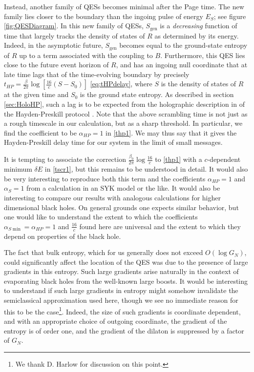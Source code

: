 \documentclass[12pt]{article}
\renewcommand{\ln}{\log}
\begin{document}
Instead, another family of QESs becomes minimal after the Page time.  The new family lies closer to the boundary than the ingoing pulse of energy $E_S$; see figure \ref{fig:QESDiagram}.  In this new family of QESs, $S_{\text{gen}}$ is a {\it decreasing} function of time that largely tracks the density of states of $R$ as determined by its energy.  Indeed, in the asymptotic future, $S_{\text{gen}}$ becomes equal to the ground-state entropy of $R$ up to a term associated with the coupling to $B$.  Furthermore, this QES lies close to the future event horizon of $R$, and has an ingoing null coordinate that at late time lags that of the time-evolving boundary by precisely $t_{HP}= \frac{\beta}{2\pi} \ln \left[ \frac{16}{c}(S-S_0)\right]$ \eqref{eq:tHPdelay}, where $S$ is the density of states of $R$ at the given time and $S_0$ is the ground state entropy.  As described in section \ref{sec:HoloHP}, such a lag is to be expected from the holographic description in \cite{Almheiri:2018xdw} of the Hayden-Preskill protocol \cite{Hayden:2007cs}.  Note that the above scrambling time is not just as a rough timescale in our calculation, but as a sharp threshold. In particular, we find the coefficient to be $\alpha_{HP}=1$ in \eqref{thp1}. We may thus say that it gives the Hayden-Preskill delay time for our system in the limit of small messages.

It is tempting to associate the correction $\frac{\beta_0}{2\pi} \ln \frac{16}{c}$ to \eqref{thp1} with a $c$-dependent minimum $\delta E$ in \eqref{tscr1}, but this remains to be understood in detail.  It would also be very interesting to reproduce both this term and the coefficients $\alpha_{HP}=1$ and $\alpha_{S}=1$ from a calculation in an SYK model \cite{Kitaevtalk, Maldacena:2016hyu, Sachdev:1992fk} or the like.  It would also be interesting to compare our results with analogous calculations for higher dimensional black holes.  On general grounds one expects similar behavior, but one would like to understand the extent to which the coefficients $\alpha_{S \min} = \alpha_{HP}=1$ and $\frac{16}{c}$  found here are universal and the extent to which they depend on properties of the black hole.

The fact that bulk entropy, which for us generally does not exceed $O(\ln G_N)$, could significantly affect the location of the QES was due to the presence of large gradients in this entropy.  Such large gradients arise naturally in the context of evaporating black holes from the well-known large boosts.  It would be interesting to understand if such large gradients in entropy might somehow invalidate the semiclassical approximation used here, though we see no immediate reason for this to be the case\footnote{We thank D. Harlow for discussion on this point.}. Indeed, the size of such gradients is coordinate dependent, and with an appropriate choice of outgoing coordinate, the gradient of the entropy is of order one, and the gradient of the dilaton is suppressed by a factor of $G_N$.
\end{document}
